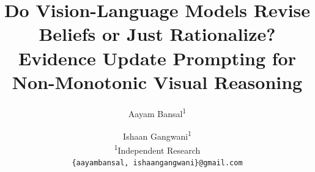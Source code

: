 \documentclass[10pt,twocolumn,letterpaper]{article}
\title{Do Vision-Language Models Revise Beliefs or Just Rationalize?\\Evidence Update Prompting for Non-Monotonic Visual Reasoning}
\author{Aayam Bansal\textsuperscript{1} \and Ishaan Gangwani\textsuperscript{1}\\
\textsuperscript{1}Independent Research\\
{\tt\small \{aayambansal, ishaangangwani\}@gmail.com}}
\begin{document}
\maketitle









{
    \small
    
    
}
\end{document}
